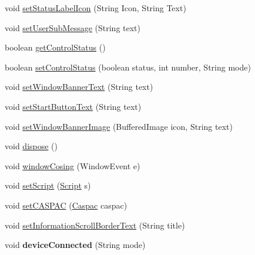 \begin{DoxyCompactItemize}
\item 
void \hyperlink{class_g_u_i_1_1development_1_1_c_a_s_u_a_l_g_u_i_main_a170989ec0cb4c6fb7d0270728e465776}{set\-Status\-Label\-Icon} (String Icon, String Text)
\item 
void \hyperlink{class_g_u_i_1_1development_1_1_c_a_s_u_a_l_g_u_i_main_a1ad431a43a59e8acf25c2be36c29c17f}{set\-User\-Sub\-Message} (String text)
\item 
boolean \hyperlink{class_g_u_i_1_1development_1_1_c_a_s_u_a_l_g_u_i_main_a6719acd9ad3f7a0f402bbe2ce22b31a4}{get\-Control\-Status} ()
\item 
boolean \hyperlink{class_g_u_i_1_1development_1_1_c_a_s_u_a_l_g_u_i_main_a03643832a900fe8423652c98a510bc47}{set\-Control\-Status} (boolean status, int number, String mode)
\item 
void \hyperlink{class_g_u_i_1_1development_1_1_c_a_s_u_a_l_g_u_i_main_a07af5ccca23c6072cbf5f931bc17a07c}{set\-Window\-Banner\-Text} (String text)
\item 
void \hyperlink{class_g_u_i_1_1development_1_1_c_a_s_u_a_l_g_u_i_main_ae90fd8598f7b601352e62926f1315bea}{set\-Start\-Button\-Text} (String text)
\item 
void \hyperlink{class_g_u_i_1_1development_1_1_c_a_s_u_a_l_g_u_i_main_aaf873cc8622dd33a0be825e34edcdf35}{set\-Window\-Banner\-Image} (Buffered\-Image icon, String text)
\item 
void \hyperlink{class_g_u_i_1_1development_1_1_c_a_s_u_a_l_g_u_i_main_a4ca4e8e4ce530ee7f5fbabee0a676990}{dispose} ()
\item 
void \hyperlink{class_g_u_i_1_1development_1_1_c_a_s_u_a_l_g_u_i_main_a2f784081877d55eeeec7de5a58368fd4}{window\-Cosing} (Window\-Event e)
\item 
void \hyperlink{class_g_u_i_1_1development_1_1_c_a_s_u_a_l_g_u_i_main_a386f1de138c72db720e1685c97b482da}{set\-Script} (\hyperlink{class_c_a_s_u_a_l_1_1caspac_1_1_script}{Script} s)
\item 
void \hyperlink{class_g_u_i_1_1development_1_1_c_a_s_u_a_l_g_u_i_main_ab8972d6f2f9c3a49bb77bb63f4cb5377}{set\-C\-A\-S\-P\-A\-C} (\hyperlink{class_c_a_s_u_a_l_1_1caspac_1_1_caspac}{Caspac} caspac)
\item 
void \hyperlink{class_g_u_i_1_1development_1_1_c_a_s_u_a_l_g_u_i_main_acfc62a17991bc1e9abd6868532c26996}{set\-Information\-Scroll\-Border\-Text} (String title)
\item 
\hypertarget{class_g_u_i_1_1development_1_1_c_a_s_u_a_l_g_u_i_main_a33e12f699bc7501eab8c6b7c4a8b216e}{void {\bfseries device\-Connected} (String mode)}\label{class_g_u_i_1_1development_1_1_c_a_s_u_a_l_g_u_i_main_a33e12f699bc7501eab8c6b7c4a8b216e}


\end{DoxyCompactItemize}

